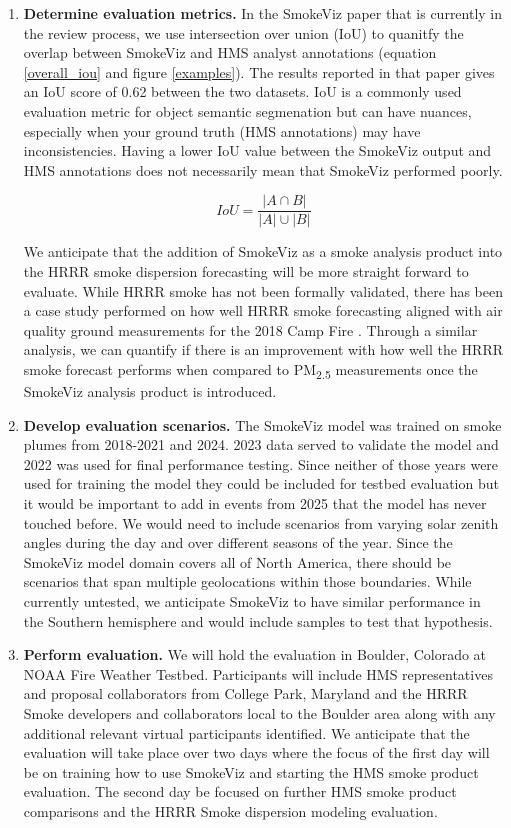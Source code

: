 \begin{enumerate}
    \item \textbf{Determine evaluation metrics.} In the SmokeViz paper that is currently in the review process, we use intersection over union (IoU) to quanitfy the overlap between SmokeViz and HMS analyst annotations (equation \ref{overall_iou} and figure \ref{examples}). The results reported in that paper gives an IoU score of 0.62 between the two datasets. IoU is a commonly used evaluation metric for object semantic segmenation but can have nuances, especially when your ground truth (HMS annotations) may have inconsistencies. Having a lower IoU value between the SmokeViz output and HMS annotations does not necessarily mean that SmokeViz performed poorly. 

\begin{equation} \label{overall_iou}
    IoU = \frac{| A \cap B|}{|A|\cup|B|}
\end{equation}

        We anticipate that the addition of SmokeViz as a smoke analysis product into the HRRR smoke dispersion forecasting will be more straight forward to evaluate. While HRRR smoke has not been formally validated, there has been a case study performed on how well HRRR smoke forecasting aligned with air quality ground measurements for the 2018 Camp Fire \cite{camp}. Through a similar analysis, we can quantify if there is an improvement with how well the HRRR smoke forecast performs when compared to PM\textsubscript{2.5} measurements once the SmokeViz analysis product is introduced.

    \item \textbf{Develop evaluation scenarios.} The SmokeViz model was trained on smoke plumes from 2018-2021 and 2024. 2023 data served to validate the model and 2022 was used for final performance testing. Since neither of those years were used for training the model they could be included for testbed evaluation but it would be important to add in events from 2025 that the model has never touched before. We would need to include scenarios from varying solar zenith angles during the day and over different seasons of the year. Since the SmokeViz model domain covers all of North America, there should be scenarios that span multiple geolocations within those boundaries. While currently untested, we anticipate SmokeViz to have similar performance in the Southern hemisphere and would include samples to test that hypothesis.

    \item \textbf{Perform evaluation.} We will hold the evaluation in Boulder, Colorado at NOAA Fire Weather Testbed. Participants will include HMS representatives and proposal collaborators from College Park, Maryland and the HRRR Smoke developers and collaborators local to the Boulder area along with any additional relevant virtual participants identified. We anticipate that the evaluation will take place over two days where the focus of the first day will be on training how to use SmokeViz and starting the HMS smoke product evaluation. The second day be focused on further HMS smoke product comparisons and the HRRR Smoke dispersion modeling evaluation.


\end{enumerate}
